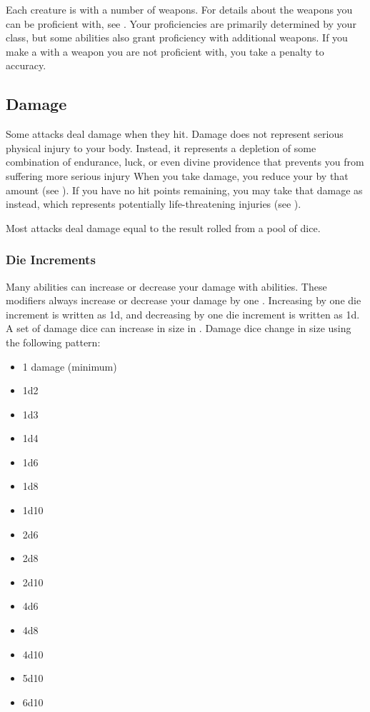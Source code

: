              Each creature is  with a number of weapons.
            For details about the weapons you can be proficient with, see .
            Your proficiencies are primarily determined by your class, but some abilities also grant proficiency with additional weapons.
            If you make a  with a weapon you are not proficient with, you take a  penalty to accuracy.

    \subsection{Damage}\label{Damage}
        Some attacks deal damage when they hit.
        Damage does not represent serious physical injury to your body.
        Instead, it represents a depletion of some combination of endurance, luck, or even divine providence that prevents you from suffering more serious injury
        When you take damage, you reduce your  by that amount (see ).
        If you have no hit points remaining, you may take that damage as  instead, which represents potentially life-threatening injuries (see ).

        Most attacks deal damage equal to the result rolled from a pool of dice.

        \subsubsection{Die Increments}\label{Die Increments}
            Many abilities can increase or decrease your damage with abilities.
            These modifiers always increase or decrease your damage by one .
            Increasing by one die increment is written as \plus1d, and decreasing by one die increment is written as \minus1d.
            A set of damage dice can increase in size in .
            Damage dice change in size using the following pattern:
            \begin{itemize}
                \item 1 damage (minimum)
                \item 1d2
                \item 1d3
                \item 1d4
                \item 1d6
                \item 1d8
                \item 1d10
                \item 2d6
                \item 2d8
                \item 2d10
                \item 4d6
                \item 4d8
                \item 4d10
                \item 5d10
                \item 6d10
            \end{itemize}

